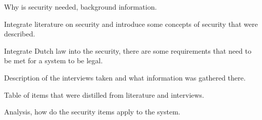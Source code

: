 Why is security needed, background information.

Integrate literature on security and introduce some concepts of security that were described.

Integrate Dutch law into the security, there are some requirements that need to be met for a system to be legal.

Description of the interviews taken and what information was gathered there.

Table of items that were distilled from literature and interviews.

Analysis, how do the security items apply to the system.